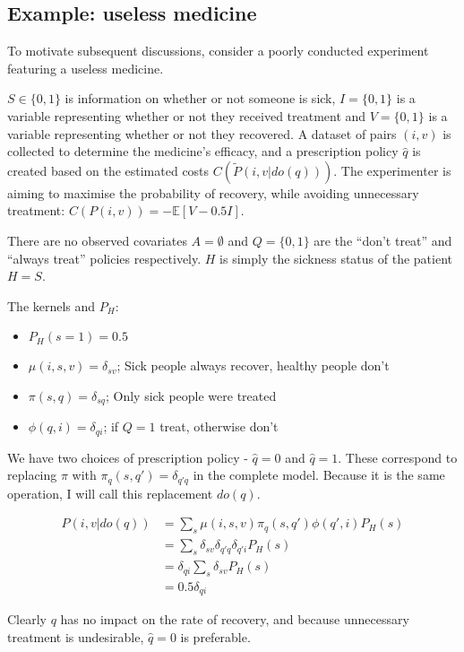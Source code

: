 \subsection{Example: useless medicine}

To motivate subsequent discussions, consider a poorly conducted experiment featuring a useless medicine. 

$S\in \{0,1\}$ is information on whether or not someone is sick, $I=\{0,1\}$ is a variable representing whether or not they received treatment and $V=\{0,1\}$ is a variable representing whether or not they recovered. A dataset of pairs $(i,v)$ is collected to determine the medicine's efficacy, and a prescription policy $\hat{q}$ is created based on the estimated costs $C(\tilde{P}(i,v|do(q)))$.  The experimenter is aiming to maximise the probability of recovery, while avoiding unnecessary treatment: $C(P(i,v))=-\mathbb{E}[V-0.5I]$. 

There are no observed covariates $A=\emptyset$ and $Q=\{0,1\}$ are the ``don't treat'' and ``always treat'' policies respectively. $H$ is simply the sickness status of the patient $H=S$.

The kernels and $P_H$:
\begin{itemize}
    \item $P_H(s=1) = 0.5$
    \item $\mu(i,s,v) =\delta_{sv}$; Sick people always recover, healthy people don't
    \item $\pi(s,q)=\delta_{sq}$; Only sick people were treated
    \item $\phi(q,i)=\delta_{qi}$; if $Q=1$ treat, otherwise don't
\end{itemize}

We have two choices of prescription policy - $\hat{q}=0$ and $\hat{q}=1$. These correspond to replacing $\pi$ with $\pi_{q}(s,q') = \delta_{q'q}$ in the complete model. Because it is the same operation, I will call this replacement $do(q)$.

\begin{align}
    P(i,v|do(q)) &= \sum_{s} \mu(i,s,v) \pi_{q}(s,q') \phi(q',i) P_H(s) \\
                         &= \sum_{s} \delta_{sv} \delta_{q'q} \delta_{q'i} P_H(s) \\
                         &= \delta_{qi} \sum_{s} \delta_{sv} P_H(s) \\
                         &= 0.5 \delta_{qi}
\end{align}

Clearly $q$ has no impact on the rate of recovery, and because unnecessary treatment is undesirable, $\hat{q}=0$ is preferable.

